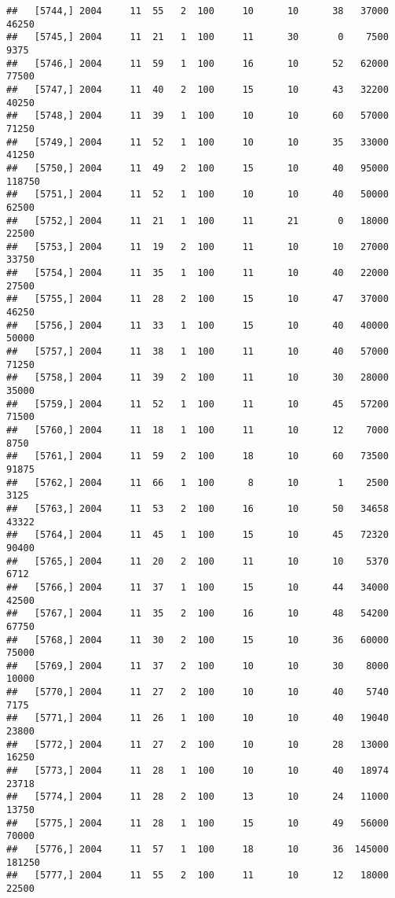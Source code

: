 \documentclass{article}\usepackage[]{graphicx}\usepackage[]{color}
\makeatletter
\newenvironment{kframe}{%
 \def\at@end@of@kframe{}%
 \ifinner\ifhmode%
  \def\at@end@of@kframe{\end{minipage}}%
  \begin{minipage}{\columnwidth}%
 \fi\fi%
 \def\FrameCommand##1{\hskip\@totalleftmargin \hskip-\fboxsep
 \colorbox{shadecolor}{##1}\hskip-\fboxsep
     \hskip-\linewidth \hskip-\@totalleftmargin \hskip\columnwidth}%
 \MakeFramed {\advance\hsize-\width
   \@totalleftmargin\z@ \linewidth\hsize
   \@setminipage}}%
 {\par\unskip\endMakeFramed%
 \at@end@of@kframe}
\newenvironment{knitrout}{}{} %
\makeatother
\begin{document}
\begin{knitrout}
\begin{kframe}
\begin{verbatim}
##   [5744,] 2004     11  55   2  100     10      10      38   37000   46250
##   [5745,] 2004     11  21   1  100     11      30       0    7500    9375
##   [5746,] 2004     11  59   1  100     16      10      52   62000   77500
##   [5747,] 2004     11  40   2  100     15      10      43   32200   40250
##   [5748,] 2004     11  39   1  100     10      10      60   57000   71250
##   [5749,] 2004     11  52   1  100     10      10      35   33000   41250
##   [5750,] 2004     11  49   2  100     15      10      40   95000  118750
##   [5751,] 2004     11  52   1  100     10      10      40   50000   62500
##   [5752,] 2004     11  21   1  100     11      21       0   18000   22500
##   [5753,] 2004     11  19   2  100     11      10      10   27000   33750
##   [5754,] 2004     11  35   1  100     11      10      40   22000   27500
##   [5755,] 2004     11  28   2  100     15      10      47   37000   46250
##   [5756,] 2004     11  33   1  100     15      10      40   40000   50000
##   [5757,] 2004     11  38   1  100     11      10      40   57000   71250
##   [5758,] 2004     11  39   2  100     11      10      30   28000   35000
##   [5759,] 2004     11  52   1  100     11      10      45   57200   71500
##   [5760,] 2004     11  18   1  100     11      10      12    7000    8750
##   [5761,] 2004     11  59   2  100     18      10      60   73500   91875
##   [5762,] 2004     11  66   1  100      8      10       1    2500    3125
##   [5763,] 2004     11  53   2  100     16      10      50   34658   43322
##   [5764,] 2004     11  45   1  100     15      10      45   72320   90400
##   [5765,] 2004     11  20   2  100     11      10      10    5370    6712
##   [5766,] 2004     11  37   1  100     15      10      44   34000   42500
##   [5767,] 2004     11  35   2  100     16      10      48   54200   67750
##   [5768,] 2004     11  30   2  100     15      10      36   60000   75000
##   [5769,] 2004     11  37   2  100     10      10      30    8000   10000
##   [5770,] 2004     11  27   2  100     10      10      40    5740    7175
##   [5771,] 2004     11  26   1  100     10      10      40   19040   23800
##   [5772,] 2004     11  27   2  100     10      10      28   13000   16250
##   [5773,] 2004     11  28   1  100     10      10      40   18974   23718
##   [5774,] 2004     11  28   2  100     13      10      24   11000   13750
##   [5775,] 2004     11  28   1  100     15      10      49   56000   70000
##   [5776,] 2004     11  57   1  100     18      10      36  145000  181250
##   [5777,] 2004     11  55   2  100     11      10      12   18000   22500

\end{verbatim}
\end{kframe}
\end{knitrout}
\end{document}
